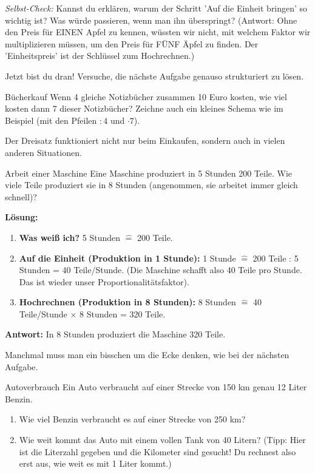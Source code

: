 \textit{Selbst-Check:} Kannst du erklären, warum der Schritt 'Auf die Einheit bringen' so wichtig ist? Was würde passieren, wenn man ihn überspringt? (Antwort: Ohne den Preis für EINEN Apfel zu kennen, wüssten wir nicht, mit welchem Faktor wir multiplizieren müssen, um den Preis für FÜNF Äpfel zu finden. Der 'Einheitspreis' ist der Schlüssel zum Hochrechnen.)

Jetzt bist du dran! Versuche, die nächste Aufgabe genauso strukturiert zu lösen.

\begin{aufgabenumgebung}{Bücherkauf}
Wenn 4 gleiche Notizbücher zusammen 10 Euro kosten, wie viel kosten dann 7 dieser Notizbücher?
Zeichne auch ein kleines Schema wie im Beispiel (mit den Pfeilen $:4$ und $\cdot7$).
\end{aufgabenumgebung}

Der Dreisatz funktioniert nicht nur beim Einkaufen, sondern auch in vielen anderen Situationen.

\begin{beispielumgebung}{Arbeit einer Maschine}
Eine Maschine produziert in 5 Stunden 200 Teile. Wie viele Teile produziert sie in 8 Stunden (angenommen, sie arbeitet immer gleich schnell)?

\textbf{Lösung:}
\begin{enumerate}
    \item \textbf{Was weiß ich?} 5 Stunden $\widehat{=}$ 200 Teile.
    \item \textbf{Auf die Einheit (Produktion in 1 Stunde):}
        1 Stunde $\widehat{=}$ 200 Teile : 5 Stunden = 40 Teile/Stunde.
        (Die Maschine schafft also 40 Teile pro Stunde. Das ist wieder unser Proportionalitätsfaktor).
    \item \textbf{Hochrechnen (Produktion in 8 Stunden):}
        8 Stunden $\widehat{=}$ 40 Teile/Stunde $\times$ 8 Stunden = 320 Teile.
\end{enumerate}
\textbf{Antwort:} In 8 Stunden produziert die Maschine 320 Teile.
\end{beispielumgebung}

Manchmal muss man ein bisschen um die Ecke denken, wie bei der nächsten Aufgabe.

\begin{aufgabenumgebung}{Autoverbrauch}
Ein Auto verbraucht auf einer Strecke von 150 km genau 12 Liter Benzin.
\begin{enumerate}
    \item Wie viel Benzin verbraucht es auf einer Strecke von 250 km?
    \item Wie weit kommt das Auto mit einem vollen Tank von 40 Litern? (Tipp: Hier ist die Literzahl gegeben und die Kilometer sind gesucht! Du rechnest also erst aus, wie weit es mit 1 Liter kommt.)
\end{enumerate}
\end{aufgabenumgebung}


